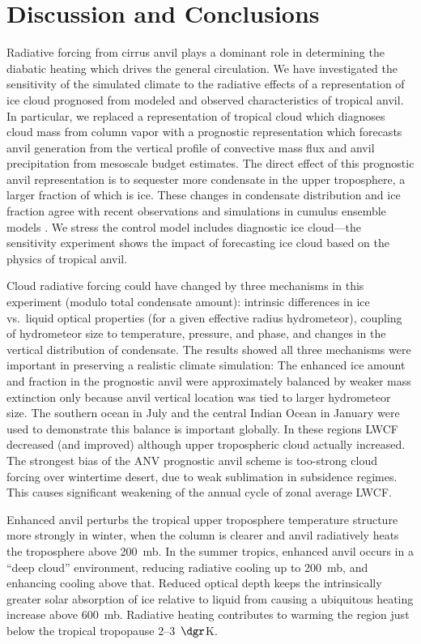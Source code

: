 \documentclass[agums]{aguplus}
\begin{document}
\section{Discussion and Conclusions}\label{sec:gcm_disc}

Radiative forcing from cirrus anvil plays a dominant role in
determining the diabatic heating which drives the general circulation.
We have investigated the sensitivity of the simulated climate to
the radiative effects of a representation of ice cloud prognosed from 
modeled and observed characteristics of tropical anvil. 
In particular, we replaced a representation of tropical cloud which
diagnoses cloud mass from column vapor with a prognostic
representation which forecasts anvil generation from the vertical
profile of convective mass flux and anvil precipitation from mesoscale
budget estimates.
The direct effect of this prognostic anvil representation is to
sequester more condensate in the upper troposphere, a larger fraction
of which is ice.
These changes in condensate distribution and ice fraction agree with
recent observations \cite[]{WSS931,GrM96} and simulations in cumulus
ensemble models \cite[]{SLT94,GMK95}. 
We stress the control model includes diagnostic ice cloud---the
sensitivity experiment shows the impact of forecasting ice cloud based
on the physics of tropical anvil.

Cloud radiative forcing could have changed by three mechanisms in this
experiment (modulo total condensate amount): intrinsic differences in
ice vs.\ liquid optical properties (for a given effective radius
hydrometeor), coupling of hydrometeor size to temperature,
pressure, and phase, and changes in the vertical distribution of
condensate. 
The results showed all three mechanisms were important in preserving
a realistic climate simulation: 
The enhanced ice amount and fraction in the prognostic anvil were
approximately balanced by weaker mass extinction only because
anvil vertical location was tied to larger hydrometeor size.
The southern ocean in July and the central Indian Ocean in January 
were used to demonstrate this balance is important globally.
In these regions LWCF decreased (and improved) although upper
tropospheric cloud actually increased.
The strongest bias of the ANV prognostic anvil scheme is too-strong
cloud forcing over wintertime desert, due to weak sublimation in
subsidence regimes.
This causes significant weakening of the annual cycle of zonal average
LWCF.

Enhanced anvil perturbs the tropical upper troposphere temperature
structure more strongly in winter, when the column is clearer and
anvil radiatively heats the troposphere above 200~mb. 
In the summer tropics, enhanced anvil occurs in a ``deep cloud''
environment, reducing radiative cooling up to 200~mb, and enhancing
cooling above that. 
Reduced optical depth keeps the intrinsically greater solar absorption
of ice relative to liquid from causing a ubiquitous heating increase
above 600~mb.
Radiative heating contributes to warming the region just below the
tropical tropopause 2--3~$\dgr$K.   
\end{document}
